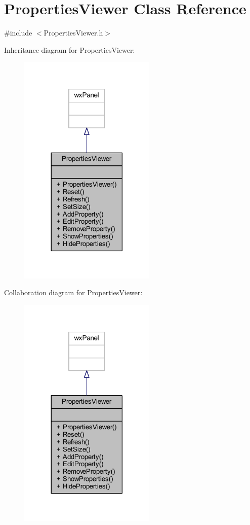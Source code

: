 \hypertarget{class_properties_viewer}{}\section{Properties\+Viewer Class Reference}
\label{class_properties_viewer}


{\ttfamily \#include $<$Properties\+Viewer.\+h$>$}



Inheritance diagram for Properties\+Viewer\+:
\nopagebreak
\begin{figure}[H]
\begin{center}
\leavevmode
\includegraphics[width=185pt]{class_properties_viewer__inherit__graph}
\end{center}
\end{figure}


Collaboration diagram for Properties\+Viewer\+:
\nopagebreak
\begin{figure}[H]
\begin{center}
\leavevmode
\includegraphics[width=185pt]{class_properties_viewer__coll__graph}
\end{center}
\end{figure}
